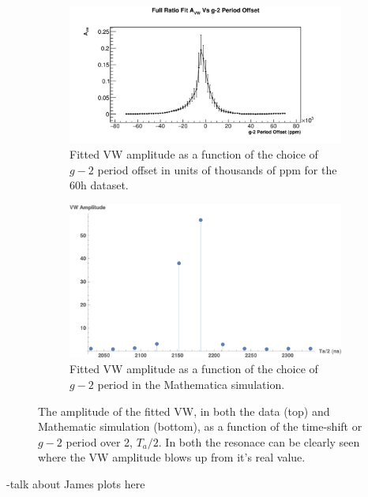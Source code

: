 \documentclass[12pt,letterpaper]{article}
\def\gmtwo{$g-2$\xspace}
\begin{document}
\begin{figure}[]
\centering
    \begin{subfigure}[t]{0.8\textwidth}
        \centering
        \includegraphics[width=\textwidth]{AvwResonance_60h}
        \caption{Fitted VW amplitude as a function of the choice of \gmtwo period offset in units of thousands of ppm for the 60h dataset.}
    \end{subfigure}%
    \vspace{1cm}
    \begin{subfigure}[t]{0.6\textwidth}
        \centering
        \includegraphics[width=\textwidth]{AvwResonance_Mathematica}
        \caption{Fitted VW amplitude as a function of the choice of \gmtwo period in the Mathematica simulation.}
    \end{subfigure}
\caption[]{The amplitude of the fitted VW, in both the data (top) and Mathematic simulation (bottom), as a function of the time-shift or \gmtwo period over 2, $T_{a}/2$. In both the resonace can be clearly seen where the VW amplitude blows up from it's real value.}
\label{fig:resonance}
\end{figure}


-talk about James plots here
\end{document}
